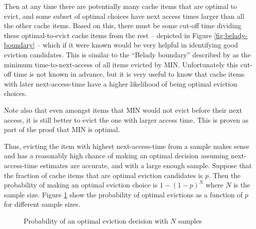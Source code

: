 
Then at any time there are potentially many cache items that are optimal to evict, and some subset of optimal choices have next access times larger than all the other cache items. Based on this, there must be some cut-off time dividing these optimal-to-evict cache items from the rest -- depicted in Figure \ref{fig:belady-boundary} -- which if it were known would be very helpful in identifying good eviction candidates. This is similar to the ``Belady boundary'' described by \citet{relaxedBelady} as the minimum time-to-next-access of all items evicted by MIN. Unfortunately this cut-off time is not known in advance, but it is very useful to know that cache items with later next-access-time have a higher likelihood of being optimal eviction choices. 

Note also that even amongst items that MIN would not evict before their next access, it is still better to evict the one with larger access time. This is proven as part of the proof that MIN is optimal.~\cite{MINOptimality} %

Thus, evicting the item with highest next-access-time from a sample makes sense and has a reasonably high chance of making an optimal decision assuming next-access-time estimates are accurate, and with a large enough sample. Suppose that the fraction of cache items that are optimal eviction candidates is $p$. Then the probability of making an optimal eviction choice is $1-(1-p)^N$ where $N$ is the sample size. Figure \ref{plot:P-opt-eviction} show the probability of optimal evictions as a function of $p$ for different sample sizes.

\begin{figure}
    \centering
    \caption{Probability of an optimal eviction decision with $N$ samples}
    \label{plot:P-opt-eviction}
\end{figure}



